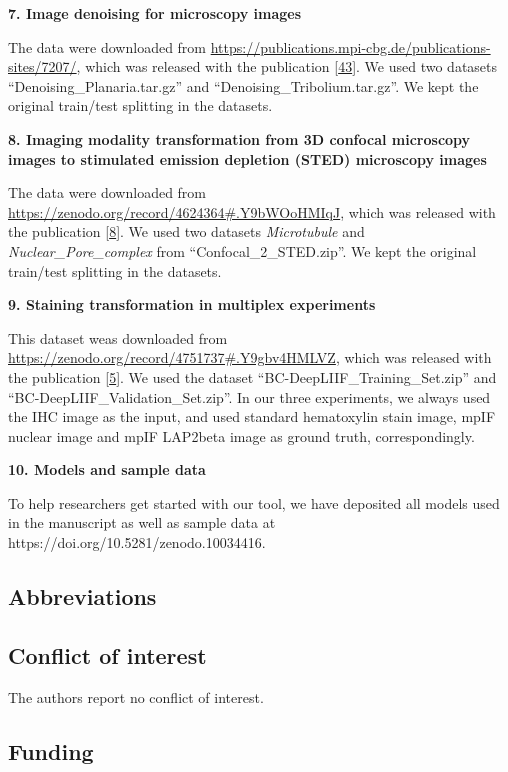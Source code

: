 \textbf{7. Image denoising for microscopy images}

The data were downloaded from \url{https://publications.mpi-cbg.de/publications-sites/7207/}, which was released with the publication {[}\protect\hyperlink{ref-12G712Zky}{43}{]}. We used two datasets ``Denoising\_Planaria.tar.gz'' and ``Denoising\_Tribolium.tar.gz''. We kept the original train/test splitting in the datasets.

\textbf{8. Imaging modality transformation from 3D confocal microscopy images to stimulated emission depletion (STED) microscopy images}

The data were downloaded from \url{https://zenodo.org/record/4624364\#.Y9bWOoHMIqJ}, which was released with the publication {[}\protect\hyperlink{ref-UEBDZ3tI}{8}{]}. We used two datasets \emph{Microtubule} and \emph{Nuclear\_Pore\_complex} from ``Confocal\_2\_STED.zip''. We kept the original train/test splitting in the datasets.

\textbf{9. Staining transformation in multiplex experiments}

This dataset weas downloaded from \url{https://zenodo.org/record/4751737\#.Y9gbv4HMLVZ}, which was released with the publication {[}\protect\hyperlink{ref-WwenuBHa}{5}{]}. We used the dataset ``BC-DeepLIIF\_Training\_Set.zip'' and ``BC-DeepLIIF\_Validation\_Set.zip''. In our three experiments, we always used the IHC image as the input, and used standard hematoxylin stain image, mpIF nuclear image and mpIF LAP2beta image as ground truth, correspondingly.

\textbf{10. Models and sample data}

To help researchers get started with our tool, we have deposited all models used in the manuscript as well as sample data at https://doi.org/10.5281/zenodo.10034416.

\hypertarget{abbreviations}{%
\subsection{Abbreviations}\label{abbreviations}}

\hypertarget{conflict-of-interest}{%
\subsection{Conflict of interest}\label{conflict-of-interest}}

The authors report no conflict of interest.

\hypertarget{funding}{%
\subsection{Funding}\label{funding}}

